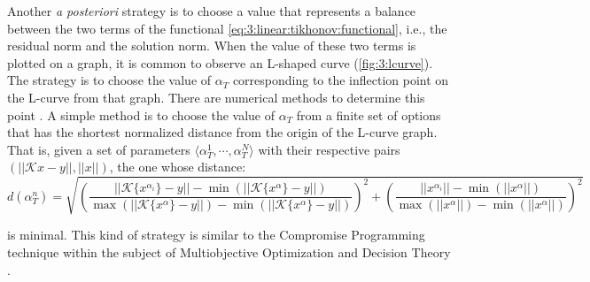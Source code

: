 				Another \textit{a posteriori} strategy is to choose a value that represents a balance between the two terms of the functional \eqref{eq:3:linear:tikhonov:functional}, i.e., the residual norm and the solution norm. When the value of these two terms is plotted on a graph, it is common to observe an L-shaped curve (\autoref{fig:3:lcurve}). The strategy is to choose the value of $\alpha_T$ corresponding to the inflection point on the L-curve from that graph. There are numerical methods to determine this point \citep{hansen1993use,calvetti2000tikhonov}. A simple method is to choose the value of $\alpha_T$ from a finite set of options that has the shortest normalized distance from the origin of the L-curve graph. That is, given a set of parameters $\langle \alpha_T^1,\cdots,\alpha_T^N \rangle$ with their respective pairs $(||\mathcal{K}{x}-y||,||x||)$, the one whose distance:
				\begin{equation}
					d(\alpha_T^n) = \sqrt{\left(\frac{||\mathcal{K}\{x^{\alpha_i}\}-y||-\min(||\mathcal{K}\{x^{\alpha}\}-y||)}{\max(||\mathcal{K}\{x^{\alpha}\}-y||)-\min(||\mathcal{K}\{x^{\alpha}\}-y||)}\right)^2 + \left(\frac{||x^{\alpha_i}||-\min(||x^\alpha||)}{\max(||x^\alpha||)-\min(||x^\alpha||)}\right)^2} \label{eq:3:linear:tikhonov:lcurve}
				\end{equation}
			
				\noindent is minimal. This kind of strategy is similar to the Compromise Programming technique within the subject of Multiobjective Optimization and Decision Theory\\\citep{chankong2008multiobjective}.

